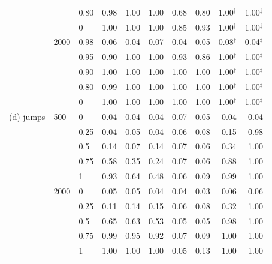 \begin{tabular}{lllrrrrrrr}
 &  & 0.80 & 0.98 & 1.00 & 1.00 & 0.68 & 0.80 & 1.00$^{\dagger}$ & 1.00$^{\ddagger}$ \\
 &  & 0 & 1.00 & 1.00 & 1.00 & 0.85 & 0.93 & 1.00$^{\dagger}$ & 1.00$^{\ddagger}$ \\
 & 2000 & 0.98 & 0.06 & 0.04 & 0.07 & 0.04 & 0.05 & 0.08$^{\dagger}$ & 0.04$^{\ddagger}$ \\
 &  & 0.95 & 0.90 & 1.00 & 1.00 & 0.93 & 0.86 & 1.00$^{\dagger}$ & 1.00$^{\ddagger}$ \\
 &  & 0.90 & 1.00 & 1.00 & 1.00 & 1.00 & 1.00 & 1.00$^{\dagger}$ & 1.00$^{\ddagger}$ \\
 &  & 0.80 & 0.99 & 1.00 & 1.00 & 1.00 & 1.00 & 1.00$^{\dagger}$ & 1.00$^{\ddagger}$ \\
 &  & 0 & 1.00 & 1.00 & 1.00 & 1.00 & 1.00 & 1.00$^{\dagger}$ & 1.00$^{\ddagger}$ \\
(d) jumps & 500 & 0 & 0.04 & 0.04 & 0.04 & 0.07 & 0.05 & 0.04 & 0.04 \\
 &  & 0.25 & 0.04 & 0.05 & 0.04 & 0.06 & 0.08 & 0.15 & 0.98 \\
 &  & 0.5 & 0.14 & 0.07 & 0.14 & 0.07 & 0.06 & 0.34 & 1.00 \\
 &  & 0.75 & 0.58 & 0.35 & 0.24 & 0.07 & 0.06 & 0.88 & 1.00 \\
 &  & 1 & 0.93 & 0.64 & 0.48 & 0.06 & 0.09 & 0.99 & 1.00 \\
 & 2000 & 0 & 0.05 & 0.05 & 0.04 & 0.04 & 0.03 & 0.06 & 0.06 \\
 &  & 0.25 & 0.11 & 0.14 & 0.15 & 0.06 & 0.08 & 0.32 & 1.00 \\
 &  & 0.5 & 0.65 & 0.63 & 0.53 & 0.05 & 0.05 & 0.98 & 1.00 \\
 &  & 0.75 & 0.99 & 0.95 & 0.92 & 0.07 & 0.09 & 1.00 & 1.00 \\
 &  & 1 & 1.00 & 1.00 & 1.00 & 0.05 & 0.13 & 1.00 & 1.00 \\
\bottomrule
\end{tabular}
